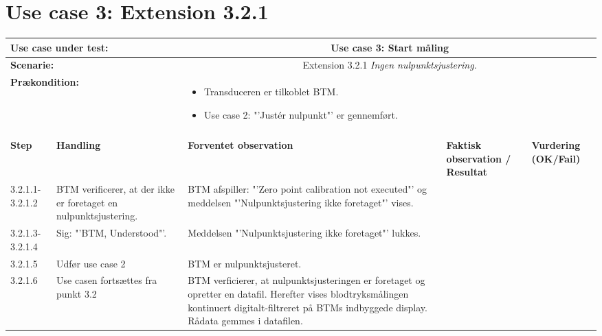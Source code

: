 \section{Use case 3: Extension 3.2.1}
\begin{tabular}{|p{1cm}|p{3cm}|p{4cm}|p{4cm}|p{2cm}|}
\hline
\multicolumn{2}{|p{3cm}|}{\textbf{Use case under test:}} & \multicolumn{3}{c|}{Use case 3: Start måling} \\\hline

\multicolumn{2}{|p{3cm}|}{\textbf{Scenarie:}} & \multicolumn{3}{c|}{Extension 3.2.1 \textit{Ingen nulpunktsjustering.}} \\\hline

\multicolumn{2}{|p{3cm}|}{\textbf{Prækondition:}}  & \multicolumn{3}{l|}{\parbox{0.6\textwidth}{
\begin{itemize}[label=$\circ$]
\item Transduceren er tilkoblet BTM.
\item Use case 2: "'Justér nulpunkt"' er gennemført. 
\end{itemize} }}\\\hline

\multicolumn{5}{|c|}{} \\\hline

\textbf{Step} & \textbf{Handling} & \textbf{Forventet observation} & \textbf{Faktisk observation / Resultat} & \textbf{Vurdering (OK/Fail)}\\\hline

3.2.1.1-3.2.1.2 & BTM verificerer, at der ikke er foretaget en nulpunktsjustering. & BTM afspiller: "'Zero point calibration not executed"' og meddelsen "'Nulpunktsjustering ikke foretaget"' vises. & & \\\hline
3.2.1.3-3.2.1.4 & Sig: "'BTM, Understood"'. & Meddelsen "'Nulpunktsjustering ikke foretaget"' lukkes.  & & 
\\\hline
3.2.1.5 & Udfør use case 2 & BTM er nulpunktsjusteret. & &
\\\hline
3.2.1.6 & Use casen fortsættes fra punkt 3.2 & BTM verficierer, at nulpunktsjusteringen er foretaget og opretter en datafil. Herefter vises blodtryksmålingen kontinuert digitalt-filtreret på BTMs indbyggede display. Rådata gemmes i datafilen. & &
\\\hline
\end{tabular}



